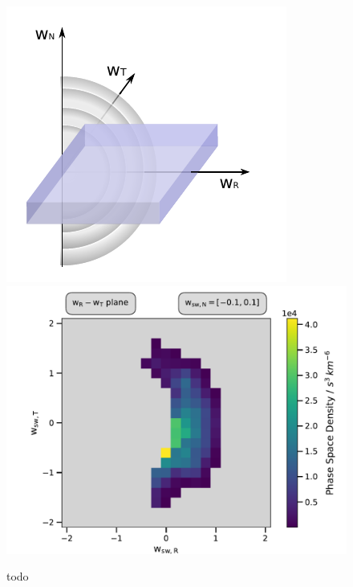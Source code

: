 
\begin{figure}[h]
	\includegraphics[width=.4\textwidth]{Figures/sketch_slice_N2.pdf}
	\includegraphics[scale=.45]{Figures/slice_50_N.pdf}
	\centering
	\caption{todo}
	\label{fig:sketch_slice_N}
\end{figure}


%
%
%
\clearpage
